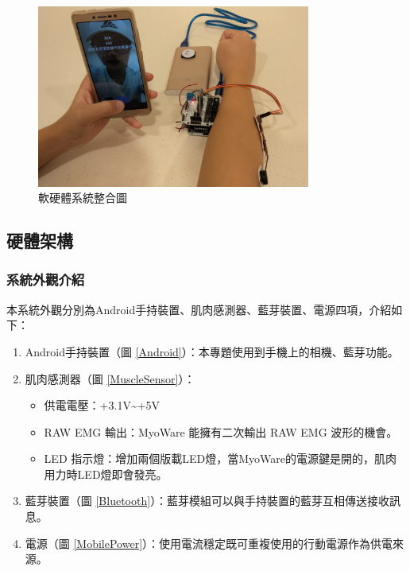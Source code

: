 \documentclass[12pt]{article}  %
\theoremstyle{plain}
\begin{document}
\begin{figure}[h]  %
\centering
\includegraphics[width=9cm]{pic/ch2/system.jpg}
\caption{軟硬體系統整合圖} \label{system}
\end{figure}

\subsection{硬體架構}

\subsubsection{系統外觀介紹}
本系統外觀分別為Android手持裝置、肌肉感測器、藍芽裝置、電源四項，介紹如下：
\begin{enumerate}
\item Android手持裝置（圖 \ref{Android}）：本專題使用到手機上的相機、藍芽功能。
\item 肌肉感測器（圖 \ref{MuscleSensor}）：
\begin{itemize}
\item 供電電壓：+3.1V\textasciitilde +5V
\item RAW EMG 輸出：MyoWare 能擁有二次輸出 RAW EMG 波形的機會。
\item LED 指示燈：增加兩個版載LED燈，當MyoWare的電源鍵是開的，肌肉用力時LED燈即會發亮。
\end{itemize}
\item 藍芽裝置（圖 \ref{Bluetooth}）：藍芽模組可以與手持裝置的藍芽互相傳送接收訊息。
\item 電源（圖 \ref{MobilePower}）：使用電流穩定既可重複使用的行動電源作為供電來源。
\end{enumerate}
\end{document}
